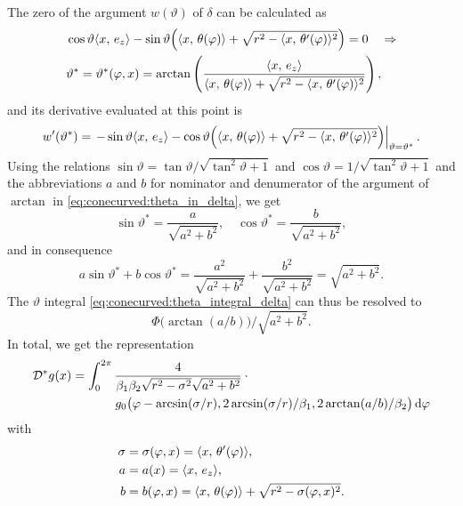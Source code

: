 \documentclass{amsart}
\renewcommand*{\phi}{\varphi}
\begin{document}
%
The zero of the argument $w(\vartheta)$ of $\delta$ can be calculated as
%
\begin{align}
 &\cos\vartheta \INNER{x}{e_z} - \sin\vartheta \Big( \INNER{x}{\theta(\phi)} + \sqrt{r^2 - \INNER{x}{\theta'(\phi)}^2} \Big) = 0 \quad
 \Rightarrow \notag \\
 \label{eq:conecurved:theta_in_delta}
 & \vartheta^* = \vartheta^*(\phi, x) = \arctan \left( \frac{\INNER{x}{e_z}}{\INNER{x}{\theta(\phi)} + \sqrt{r^2 - 
 \INNER{x}{\theta'(\phi)}^2}} \right),
\end{align}
%
and its derivative evaluated at this point is
%
\begin{equation*}
 w'(\vartheta^*) = \left. -\sin\vartheta \INNER{x}{e_z} - \cos\vartheta \Big( \INNER{x}{\theta(\phi)} + \sqrt{r^2 - 
 \INNER{x}{\theta'(\phi)}^2} \Big) \right|_{\vartheta = \vartheta^*}.
\end{equation*}
%
Using the relations $\sin\vartheta = \tan\vartheta / \sqrt{\tan^2\vartheta + 1}$ and $\cos\vartheta = 1 / \sqrt{\tan^2\vartheta + 1}$ and 
the abbreviations $a$ and $b$ for nominator and denumerator of the argument of $\arctan$ in \eqref{eq:conecurved:theta_in_delta}, we get 
%
%
\begin{equation*}
 \sin\vartheta^* = \frac{a}{\sqrt{a^2 + b^2}}, \quad \cos\vartheta^* = \frac{b}{\sqrt{a^2 + b^2}},
\end{equation*}
%
and in consequence
%
\begin{equation*}
 a\sin\vartheta^* + b\cos\vartheta^* = \frac{a^2}{\sqrt{a^2 + b^2}} + \frac{b^2}{\sqrt{a^2 + b^2}} = \sqrt{a^2 + b^2}.
\end{equation*}
%
The $\vartheta$ integral \eqref{eq:conecurved:theta_integral_delta} can thus be resolved to
%
\begin{equation*}
 \Phi\big(\arctan(a/b)\big) / \sqrt{a^2 + b^2}.
\end{equation*}
%
In total, we get the representation
%
\begin{align}
 \label{eq:conecurved:backproj}
 \DUALOPD g(x)
 &= \int_0^{2\pi} \frac{4}{\beta_1\beta_2\sqrt{r^2 - \sigma^2} \sqrt{a^2 + b^2}} \cdot \phantom{x} \\
 &\hspace{35pt} g_0 \big( \phi - \arcsin(\sigma/r), 2\arcsin(\sigma/r)/\beta_1, 2\arctan(a/b)/\beta_2 \big)\, \D\phi \notag
\end{align}
%
with
%
\begin{align}
 \label{eq:conecurved:bp_sigma}
 \sigma &= \sigma(\phi, x) = \INNER{x}{\theta'(\phi)}, \\
 \label{eq:conecurved:bp_a}
 a &= a(x) = \INNER{x}{e_z}, \\
 \label{eq:conecurved:bp_b}
 b &= b(\phi, x) = \INNER{x}{\theta(\phi)} + \sqrt{r^2 - \sigma(\phi,x)^2}.
\end{align}
\vspace{5ex}%
\end{document}
